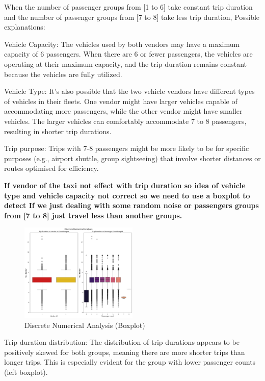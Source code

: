 \documentclass[twocolumn, 9pt]{extarticle}
\begin{document}
\hfill \break
When the number of passenger groups from [1 to 6] take constant trip duration and the number of passenger groups from [7 to 8] take less trip duration, Possible explanations:

\hfill \break
Vehicle Capacity: The vehicles used by both vendors may have a maximum capacity of 6 passengers. When there are 6 or fewer passengers, the vehicles are operating at their maximum capacity, and the trip duration remains constant because the vehicles are fully utilized.

\hfill \break
 Vehicle Type: It's also possible that the two vehicle vendors have different types of vehicles in their fleets. One vendor might have larger vehicles capable of accommodating more passengers, while the other vendor might have smaller vehicles. The larger vehicles can comfortably accommodate 7 to 8 passengers, resulting in shorter trip durations.
 
\hfill \break
Trip purpose: Trips with 7-8 passengers might be more likely to be for specific purposes (e.g., airport shuttle, group sightseeing) that involve shorter distances or routes optimised for efficiency.

\hfill \break
\textbf{ If vendor of the taxi not effect with trip duration so idea of vehicle type and vehicle capacity not correct so we need to use a boxplot  to detect If we just dealing with some random noise or passengers groups from [7 to 8] just travel less than another groups. }


\begin{figure}[ht]
\centering
    \includegraphics[width=0.50\textwidth, height=0.50\textheight]{boxplot.png}
    \caption{\label{fig:trip}Discrete Numerical Analysis (Boxplot)}
\end{figure}


\hfill \break
Trip duration distribution: The distribution of trip durations appears to be positively skewed for both groups, meaning there are more shorter trips than longer trips. This is especially evident for the group with lower passenger counts (left boxplot).
\end{document}

